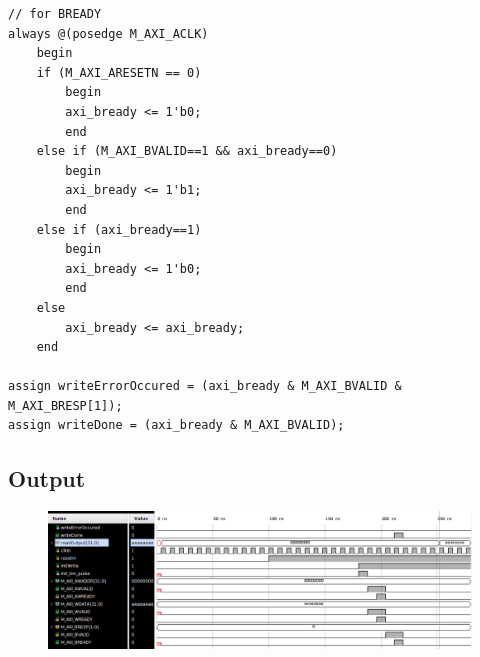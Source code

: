 \documentclass{article}
\begin{document}
\begin{verbatim}
// for BREADY
always @(posedge M_AXI_ACLK)                                    
    begin                                                                
    if (M_AXI_ARESETN == 0)                                           
        begin                                                            
        axi_bready <= 1'b0;                                            
        end                                                             
    else if (M_AXI_BVALID==1 && axi_bready==0)                              
        begin                                                            
        axi_bready <= 1'b1;                                            
        end                                                              
    else if (axi_bready==1)                                               
        begin                                                            
        axi_bready <= 1'b0;                                            
        end                                                              
    else                                                               
        axi_bready <= axi_bready;                                        
    end   

assign writeErrorOccured = (axi_bready & M_AXI_BVALID & M_AXI_BRESP[1]);
assign writeDone = (axi_bready & M_AXI_BVALID);
\end{verbatim}

\subsection{Output}
\begin{figure}[H]
    \centering
    \includegraphics[width=1\textwidth]{Resources/SingleWriteBRAMoutput.png}
\end{figure}
\end{document}
